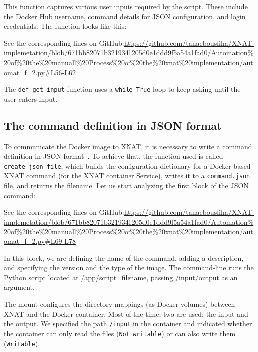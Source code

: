 This function captures various user inputs required by the script. These include the Docker Hub username, command details for JSON configuration, and login credentials.
The function looks like this:
 


\noindent\footnotesize See the corresponding lines on GitHub:\url{https://github.com/tanaebousfiha/XNAT-implemetation/blob/671bb82071b3219341205d0e1ddd9f5a54a1fad0/Automation%20of%20the%20manuall%20Process%20of%20the%20xnat%20implementation/automat_f_2.py#L56-L62}
\normalsize

The \texttt{def get\_input} function uses a \texttt{while True} loop to keep asking until the user enters input.

\subsection{The command definition in JSON format}

To communicate the Docker image to XNAT, it is necessary to write a command definition in JSON format~\cite{JSONCommand}.
To achieve that, the function used is called \texttt{create\_json\_file}, which builds the configuration dictionary for a Docker-based XNAT command (for the XNAT container Service), writes it to a \texttt{command.json} file, and returns the filename.
Let us start analyzing the first block of the JSON command:





\noindent\footnotesize See the corresponding lines on GitHub:\url{https://github.com/tanaebousfiha/XNAT-implemetation/blob/671bb82071b3219341205d0e1ddd9f5a54a1fad0/Automation%20of%20the%20manuall%20Process%20of%20the%20xnat%20implementation/automat_f_2.py#L69-L78}
\normalsize


In this block, we are defining the name of the command, adding a description, and specifying the version and the type of the image.
The command-line runs the Python script located at /app/{script\_filename}, passing /input/output as an argument.

The mount configures the directory mappings (as Docker volumes) between XNAT and the Docker container. Most of the time, two are used: the input and the output.
We specified the path \texttt{/input} in the container and indicated whether the container can only read the files (\texttt{Not writable}) or can also write them (\texttt{Writable}).

